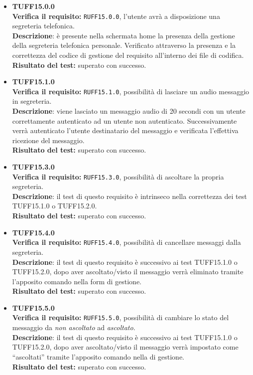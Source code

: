 \begin{itemize}
\item \textbf{TUFF15.0.0}\\
\textbf{Verifica il requisito:} \texttt{RUFF15.0.0}, l'utente avrà a disposizione una segreteria telefonica.\\
\textbf{Descrizione}: è presente nella schermata home la presenza della gestione della segreteria telefonica personale. Verificato attraverso la presenza e la correttezza del codice di gestione del requisito all'interno dei file di codifica.\\
\textbf{Risultato del test:} superato con successo.

\item \textbf{TUFF15.1.0}\\
\textbf{Verifica il requisito:} \texttt{RUFF15.1.0}, possibilità di lasciare un audio messaggio in segreteria.\\
\textbf{Descrizione}: viene lasciato un messaggio audio di 20 secondi con un utente  correttamente autenticato ad un utente  non autenticato. Successivamente verrà autenticato l'utente  destinatario del messaggio e verificata l'effettiva ricezione del messaggio.\\
\textbf{Risultato del test:} superato con successo.

\item \textbf{TUFF15.3.0}\\
\textbf{Verifica il requisito:} \texttt{RUFF15.3.0}, possibilità di ascoltare la propria segreteria.\\
\textbf{Descrizione}: il test di questo requisito è intrinseco nella correttezza dei test TUFF15.1.0 o TUFF15.2.0.\\
\textbf{Risultato del test:} superato con successo.

\item \textbf{TUFF15.4.0}\\
\textbf{Verifica il requisito:} \texttt{RUFF15.4.0}, possibilità di cancellare messaggi dalla segreteria.\\
\textbf{Descrizione}: il test di questo requisito è successivo ai test TUFF15.1.0 o TUFF15.2.0, dopo aver ascoltato/visto il messaggio verrà eliminato tramite l'apposito comando nella form di gestione.\\
\textbf{Risultato del test:} superato con successo.

\item \textbf{TUFF15.5.0}\\
\textbf{Verifica il requisito:} \texttt{RUFF15.5.0}, possibilità di cambiare lo stato del messaggio da \textit{non ascoltato} ad \textit{ascoltato}.\\
\textbf{Descrizione}: il test di questo requisito è successivo ai test TUFF15.1.0 o TUFF15.2.0, dopo aver ascoltato/visto il messaggio verrà impostato come ``ascoltati'' tramite l'apposito comando nella  di gestione.\\
\textbf{Risultato del test:} superato con successo.


\end{itemize}
